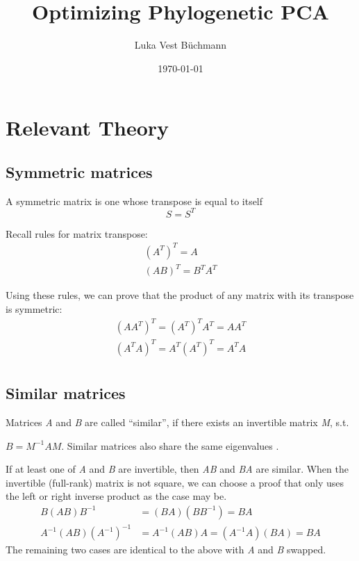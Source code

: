 \documentclass[12pt]{article}
\author{Luka Vest Büchmann}
\title{Optimizing Phylogenetic PCA}
\date{\today}
\theoremstyle{definition}
\begin{document}

\tableofcontents
\newpage

\section{Relevant Theory}

\subsection{Symmetric matrices}

A symmetric matrix is one whose transpose is equal to itself
\[ S = S^T \]

Recall rules for matrix transpose:
\begin{align*}
	(A^T)^T = A \\
	(AB)^T = B^T A^T 
\end{align*}


Using these rules, we can prove that the product of any matrix with its transpose is symmetric:
\begin{align*}
	(A A^T)^T = (A^T)^T A^T = A A^T \\
	(A^T A)^T = A^T (A^T)^T = A^T A \\
\end{align*}

\subsection{Similar matrices}

Matrices \textit{A} and \textit{B} are called ``similar'', if there exists an invertible matrix \textit{M}, s.t.

$B = M^{-1} A M$. Similar matrices also share the same eigenvalues .

If at least one of \textit{A} and \textit{B} are invertible, then \textit{AB} and \textit{BA} are similar.
When the invertible (full-rank) matrix is not square, we can choose a proof that only uses the left or right inverse product as the case may be.
\begin{align*}
	B (A B) B^{-1} &= (B A) (B B^{-1}) = B A  \\
	A^{-1} (A B) (A^{-1})^{-1} &= A^{-1} (A B) A = (A^{-1} A) (B A) = B A 
\end{align*}
The remaining two cases are identical to the above with \textit{A} and \textit{B} swapped.
\end{document}
